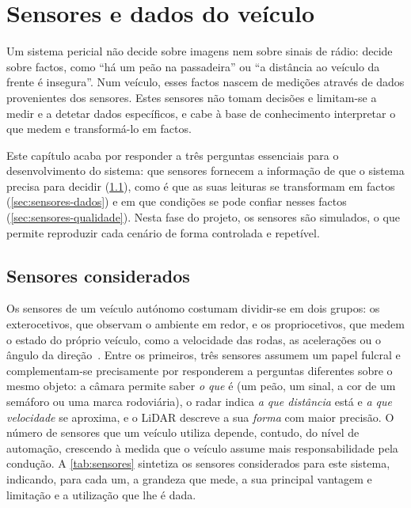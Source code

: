 \chapter{Sensores e dados do veículo}
\label{cap:sensores}

Um sistema pericial não decide sobre imagens nem sobre sinais de rádio:
decide sobre factos, como \enquote{há um peão na passadeira} ou \enquote{a distância ao
veículo da frente é insegura}. Num veículo, esses factos nascem de medições através de dados provenientes dos sensores.
Estes sensores não tomam decisões e limitam-se a medir e a detetar dados específicos, e cabe à
base de conhecimento interpretar o que medem e transformá-lo em factos.

Este capítulo acaba por
responder a três perguntas essenciais para o desenvolvimento do sistema:
que sensores fornecem a informação de que o sistema precisa para decidir
(\cref{sec:sensores-considerados}), como é que as suas leituras se
transformam em factos (\cref{sec:sensores-dados}) e em que condições se
pode confiar nesses factos (\cref{sec:sensores-qualidade}). Nesta fase do
projeto, os sensores são simulados, o que permite reproduzir cada cenário
de forma controlada e repetível.

\section{Sensores considerados}
\label{sec:sensores-considerados}

Os sensores de um veículo autónomo costumam dividir-se em dois grupos: os
exterocetivos, que observam o ambiente em redor, e os propriocetivos, que
medem o estado do próprio veículo, como a velocidade das rodas, as
acelerações ou o ângulo da direção~\cite{yeong2021}. Entre os primeiros,
três sensores assumem um papel fulcral e complementam-se precisamente por
responderem a perguntas diferentes sobre o mesmo objeto: a câmara permite
saber \emph{o que} é (um peão, um sinal, a cor de um semáforo ou uma marca
rodoviária), o radar indica \emph{a que distância} está e \emph{a que
velocidade} se aproxima, e o LiDAR descreve a sua \emph{forma} com maior
precisão. O número de sensores que um veículo utiliza depende, contudo, do
nível de automação, crescendo à medida que o veículo assume mais
responsabilidade pela condução. A \cref{tab:sensores} sintetiza os sensores
considerados para este sistema, indicando, para cada um, a grandeza que
mede, a sua principal vantagem e limitação e a utilização que lhe é dada.

